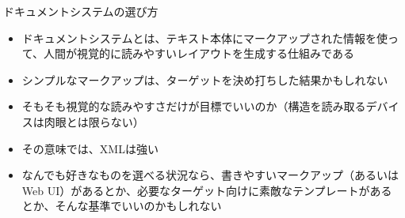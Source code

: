 \begin{frame}[containsverbatim, t]{\inhibitglue ドキュメントシステムの選び方}
  \sffamily
  
  \begin{itemize}
    \item ドキュメントシステムとは、テキスト本体にマークアップされた情報を使って、人間が視覚的に読みやすいレイアウトを生成する仕組みである
  \end{itemize}
  
  \begin{itemize}
    \item シンプルなマークアップは、ターゲットを決め打ちした結果かもしれない
    \item そもそも視覚的な読みやすさだけが目標でいいのか（構造を読み取るデバイスは肉眼とは限らない）
    \item その意味では、XMLは強い
  \end{itemize}

  \begin{itemize}
    \item なんでも好きなものを選べる状況なら、書きやすいマークアップ（あるいはWeb UI）があるとか、必要なターゲット向けに素敵なテンプレートがあるとか、そんな基準でいいのかもしれない
  \end{itemize}

\end{frame}


